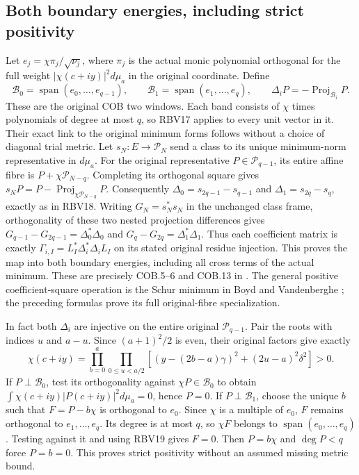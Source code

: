 \documentclass[11pt,a4paper]{article}
\begin{document}
\subsection{Both boundary energies, including strict positivity}
Let $e_j=\chi\pi_j/\sqrt{\nu_j}$, where $\pi_j$ is the actual
monic polynomial orthogonal for the full weight
$|\chi(c+iy)|^2d\mu_a$ in the original coordinate. Define
\[
\mathcal B_0=\operatorname{span}(e_0,\ldots,e_{q-1}),\qquad
\mathcal B_1=\operatorname{span}(e_1,\ldots,e_q),\qquad
\Delta_iP=-\operatorname{Proj}_{\mathcal B_i}P.
\tag{RBV18}
\]
These are the original COB two windows. Each band consists of
$\chi$ times polynomials of degree at most $q$, so RBV17 applies
to every unit vector in it.
Their exact link to the original minimum forms follows without a
choice of diagonal trial metric. Let $s_N:E\to\mathcal P_N$ send
a class to its unique minimum-norm representative in $d\mu_a$.
For the original representative $P\in\mathcal P_{q-1}$, its entire
affine fibre is $P+\chi\mathcal P_{N-q}$. Completing its orthogonal
square gives
$s_NP=P-\operatorname{Proj}_{\chi\mathcal P_{N-q}}P$.
Consequently
$\Delta_0=s_{2q-1}-s_{q-1}$ and
$\Delta_1=s_{2q}-s_q$, exactly as in RBV18.
Writing $G_N=s_N^*s_N$ in the unchanged class frame, orthogonality
of these two nested projection differences gives
$G_{q-1}-G_{2q-1}=\Delta_0^*\Delta_0$ and
$G_q-G_{2q}=\Delta_1^*\Delta_1$.
Thus each coefficient matrix is exactly
$\Gamma_{i,I}=L_I^*\Delta_i^*\Delta_iL_I$ on its stated original
residue injection. This proves the map into both boundary energies,
including all cross terms of the actual minimum.
These are precisely COB.5--6 and COB.13 in
. The general positive
coefficient-square operation is the Schur minimum in Boyd and
Vandenberghe \cite[Appendix A.5.5, p.~650]{human:boyd-vandenberghe};
the preceding formulas prove its full original-fibre specialization.

In fact both $\Delta_i$ are injective on the entire original
$\mathcal P_{q-1}$. Pair the roots with indices $u$ and $a-u$.
Since $(a+1)^2/2$ is even, their original factors give exactly
\[
\chi(c+iy)=\prod_{b=0}^a\prod_{0\le u<a/2}
\left[(y-(2b-a)\gamma)^2+(2u-a)^2\delta^2\right]>0.
\tag{RBV19}
\]
If $P\perp\mathcal B_0$, test its orthogonality against
$\chi P\in\mathcal B_0$ to obtain
$\int\chi(c+iy)|P(c+iy)|^2d\mu_a=0$, hence $P=0$.
If $P\perp\mathcal B_1$, choose the unique $b$ such that
$F=P-b\chi$ is orthogonal to $e_0$. Since $\chi$ is a multiple
of $e_0$, $F$ remains orthogonal to $e_1,\ldots,e_q$.
Its degree is at most $q$, so $\chi F$ belongs to
$\operatorname{span}(e_0,\ldots,e_q)$. Testing against it and using
RBV19 gives $F=0$. Then $P=b\chi$ and $\deg P<q$ force $P=b=0$.
This proves strict positivity without an assumed missing metric bound.
\end{document}
